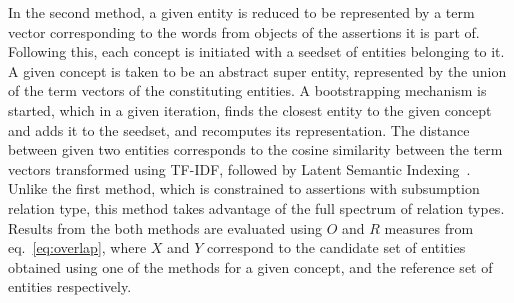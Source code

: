 \documentclass{llncs}
\begin{document}
In the second method, a given entity is reduced to be represented by a term vector corresponding to the words from objects of the assertions it is part of. Following this, each concept is initiated with a seedset of entities belonging to it. A given concept is taken to be an abstract super entity, represented by the union of the term vectors of the constituting entities. A bootstrapping mechanism is started, which in a given iteration, finds the closest entity to the given concept and adds it to the seedset, and recomputes its representation. The distance between given two entities corresponds to the cosine similarity between the term vectors transformed using TF-IDF, followed by Latent Semantic Indexing~\cite{rehurek_lrec}. Unlike the first method, which is constrained to assertions with subsumption relation type, this method takes advantage of the full spectrum of relation types. Results from the both methods are evaluated using $O$ and $R$ measures from eq.~\ref{eq:overlap}, where $X$ and $Y$ correspond to the candidate set of entities obtained using one of the methods for a given concept, and the reference set of entities respectively.
\end{document}
